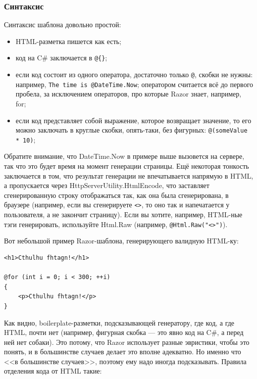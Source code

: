 \documentclass[a5paper]{article}
\begin{document}
\subsubsection{Синтаксис}

Синтаксис шаблона довольно простой:

\begin{itemize}
    \item HTML-разметка пишется как есть;
    \item код на C\# заключается в \verb|@{}|;
    \item если код состоит из одного оператора, достаточно только \verb|@|, скобки не нужны: например, \texttt{The time is @DateTime.Now}; оператором считается всё до первого пробела, за исключением операторов, про которые Razor знает, например, for;
    \item если код представляет собой выражение, которое возвращает значение, то его можно заключать в круглые скобки, опять-таки, без фигурных: \texttt{@(someValue * 10)};
\end{itemize}

Обратите внимание, что DateTime.Now в примере выше вызовется на сервере, так что это будет время на момент генерации страницы. Ещё некоторая тонкость заключается в том, что результат генерации не впечатывается напрямую в HTML, а пропускается через HttpServerUtility.HtmlEncode, что заставляет сгенерированную строку отображаться так, как она была сгенерирована, в браузере (например, если вы сгенерируете \texttt{<\body>}, то оно так и напечатается у пользователя, а не закончит страницу). Если вы хотите, например, HTML-ные тэги генерировать, используйте Html.Raw (например, \texttt{@Html.Raw("<\body>")}).

Вот небольшой пример Razor-шаблона, генерирующего валидную HTML-ку:

\begin{verbatim}
<h1>Cthulhu fhtagn!</h1>

@for (int i = 0; i < 300; ++i)
{
    <p>Cthulhu fhtagn!</p>
}
\end{verbatim}

Как видно, boilerplate-разметки, подсказывающей генератору, где код, а где HTML, почти нет (например, фигурная скобка --- это явно код на C\#, а перед ней нет собаки). Это потому, что Razor использует разные эвристики, чтобы это понять, и в большинстве случаев делает это вполне адекватно. Но именно что <<в большинстве случаев>>, поэтому ему надо иногда подсказывать. Правила отделения кода от HTML такие:
\end{document}
